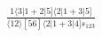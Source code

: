 \documentclass[varwidth, border=5pt]{standalone}
\begin{document}
\begin{my}
$\begin{gathered}
\scriptscriptstyle\frac{1⟨3|1+2|5]⟨2|1+3|5]}{⟨12⟩[56]⟨2|1+3|4]s_{123}}
\end{gathered}$
\end{my}
\end{document}
